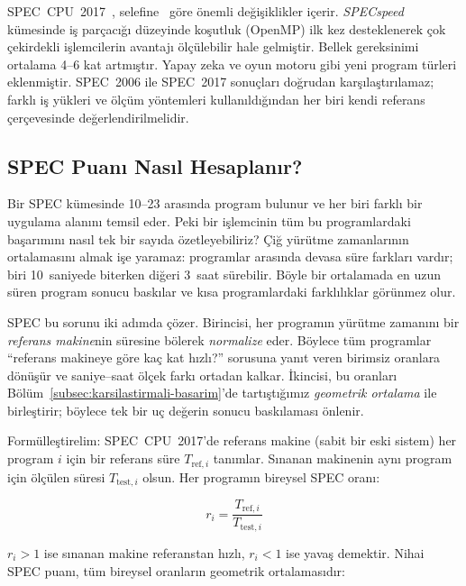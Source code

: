 \begin{bilginot}
SPEC~CPU~2017~\cite{bucek2018}, selefine~\cite{henning2006} göre önemli değişiklikler içerir. \emph{SPECspeed} kümesinde iş parçacığı düzeyinde koşutluk (OpenMP) ilk kez desteklenerek çok çekirdekli işlemcilerin avantajı ölçülebilir hale gelmiştir. Bellek gereksinimi ortalama 4--6 kat artmıştır. Yapay zeka ve oyun motoru gibi yeni program türleri eklenmiştir. SPEC~2006 ile SPEC~2017 sonuçları doğrudan karşılaştırılamaz; farklı iş yükleri ve ölçüm yöntemleri kullanıldığından her biri kendi referans çerçevesinde değerlendirilmelidir.
\end{bilginot}

\subsection{SPEC Puanı Nasıl Hesaplanır?}
\label{subsec:spec-puan-hesaplama}

Bir SPEC kümesinde 10--23 arasında program bulunur ve her biri farklı bir uygulama alanını temsil eder. Peki bir işlemcinin tüm bu programlardaki başarımını nasıl tek bir sayıda özetleyebiliriz? Çiğ yürütme zamanlarının ortalamasını almak işe yaramaz: programlar arasında devasa süre farkları vardır; biri 10~saniyede biterken diğeri 3~saat sürebilir. Böyle bir ortalamada en uzun süren program sonucu baskılar ve kısa programlardaki farklılıklar görünmez olur.

SPEC bu sorunu iki adımda çözer. Birincisi, her programın yürütme zamanını bir \emph{referans makine}nin süresine bölerek \emph{normalize} eder. Böylece tüm programlar ``referans makineye göre kaç kat hızlı?'' sorusuna yanıt veren birimsiz oranlara dönüşür ve saniye--saat ölçek farkı ortadan kalkar. İkincisi, bu oranları Bölüm~\ref{subsec:karsilastirmali-basarim}'de tartıştığımız \emph{geometrik ortalama} ile birleştirir; böylece tek bir uç değerin sonucu baskılaması önlenir.

Formülleştirelim: SPEC~CPU~2017'de referans makine (sabit bir eski sistem) her program $i$ için bir referans süre $T_{\text{ref},i}$ tanımlar. Sınanan makinenin aynı program için ölçülen süresi $T_{\text{test},i}$ olsun. Her programın bireysel SPEC oranı:

\begin{equation}
r_i = \frac{T_{\text{ref},i}}{T_{\text{test},i}}
\label{eq:spec-oran}
\end{equation}

\noindent $r_i > 1$ ise sınanan makine referanstan hızlı, $r_i < 1$ ise yavaş demektir. Nihai SPEC puanı, tüm bireysel oranların geometrik ortalamasıdır:

